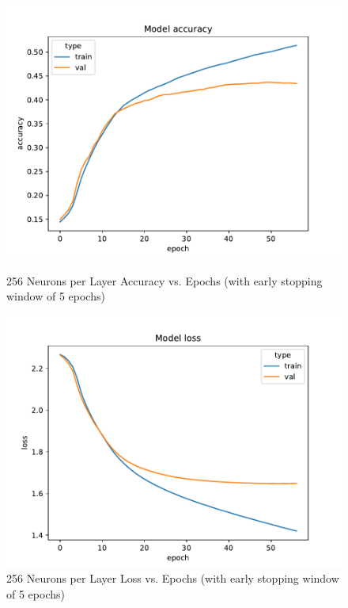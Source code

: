 \documentclass{article}
\begin{document}
    \begin{figure}[H]
        \begin{minipage}[b]{0.5\linewidth}
            \centering
            \includegraphics[width=\textwidth]{../plots/config_2f_double_accuracy}
            \caption{256 Neurons per Layer Accuracy vs. Epochs (with early stopping window of 5 epochs)}
            \label{fig:figure17}
        \end{minipage}
        \hspace{0.2cm}
        \begin{minipage}[b]{0.5\linewidth}
            \centering
            \includegraphics[width=\textwidth]{../plots/config_2f_double_loss}
            \caption{256 Neurons per Layer Loss vs. Epochs (with early stopping window of 5 epochs)}
            \label{fig:figure18}
        \end{minipage}
    \end{figure}
\end{document}
